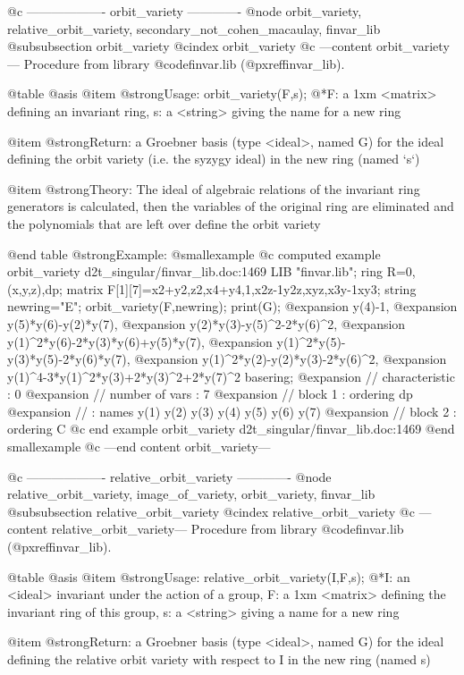 @c ------------------- orbit_variety -------------
@node orbit_variety, relative_orbit_variety, secondary_not_cohen_macaulay, finvar_lib
@subsubsection orbit_variety
@cindex orbit_variety
@c ---content orbit_variety---
Procedure from library @code{finvar.lib} (@pxref{finvar_lib}).

@table @asis
@item @strong{Usage:}
orbit_variety(F,s);
@*F: a 1xm <matrix> defining an invariant ring, s: a <string> giving the
name for a new ring

@item @strong{Return:}
a Groebner basis (type <ideal>, named G) for the ideal defining the
orbit variety (i.e. the syzygy ideal) in the new ring (named `s`)

@item @strong{Theory:}
The ideal of algebraic relations of the invariant ring generators is
calculated, then the variables of the original ring are eliminated and
the polynomials that are left over define the orbit variety

@end table
@strong{Example:}
@smallexample
@c computed example orbit_variety d2t_singular/finvar_lib.doc:1469 
LIB "finvar.lib";
ring R=0,(x,y,z),dp;
matrix F[1][7]=x2+y2,z2,x4+y4,1,x2z-1y2z,xyz,x3y-1xy3;
string newring="E";
orbit_variety(F,newring);
print(G);
@expansion{} y(4)-1,
@expansion{} y(5)*y(6)-y(2)*y(7),
@expansion{} y(2)*y(3)-y(5)^2-2*y(6)^2,
@expansion{} y(1)^2*y(6)-2*y(3)*y(6)+y(5)*y(7),
@expansion{} y(1)^2*y(5)-y(3)*y(5)-2*y(6)*y(7),
@expansion{} y(1)^2*y(2)-y(2)*y(3)-2*y(6)^2,
@expansion{} y(1)^4-3*y(1)^2*y(3)+2*y(3)^2+2*y(7)^2
basering;
@expansion{} //   characteristic : 0
@expansion{} //   number of vars : 7
@expansion{} //        block   1 : ordering dp
@expansion{} //                  : names    y(1) y(2) y(3) y(4) y(5) y(6) y(7) 
@expansion{} //        block   2 : ordering C
@c end example orbit_variety d2t_singular/finvar_lib.doc:1469
@end smallexample
@c ---end content orbit_variety---

@c ------------------- relative_orbit_variety -------------
@node relative_orbit_variety, image_of_variety, orbit_variety, finvar_lib
@subsubsection relative_orbit_variety
@cindex relative_orbit_variety
@c ---content relative_orbit_variety---
Procedure from library @code{finvar.lib} (@pxref{finvar_lib}).

@table @asis
@item @strong{Usage:}
relative_orbit_variety(I,F,s);
@*I: an <ideal> invariant under the action of a group, F: a 1xm
<matrix> defining the invariant ring of this group, s: a <string>
giving a name for a new ring

@item @strong{Return:}
a Groebner basis (type <ideal>, named G) for the ideal defining the
relative orbit variety with respect to I in the new ring (named s)

